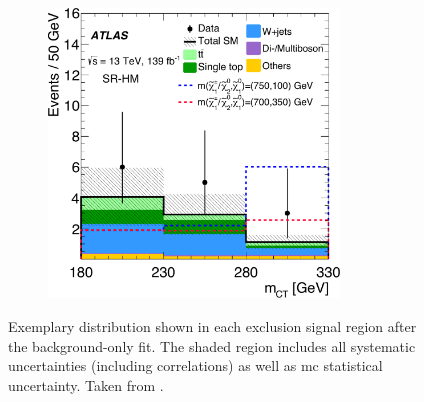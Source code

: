 \begin{figure}
\begin{subfigure}[b]{0.5\linewidth}
	\end{subfigure}\hfill
	\begin{subfigure}[b]{0.5\linewidth}
		\centering\includegraphics[width=0.85\textwidth]{fig_05c_yellow}
	\end{subfigure}\hfill

	\caption{Exemplary distribution shown in each exclusion signal region after the background-only fit. The shaded region includes all systematic uncertainties (including correlations) as well as \gls{mc} statistical uncertainty. Taken from \cite{SUSY-2019-08}.}
	\label{fig:SR_distributions_postfit}
\end{figure}


